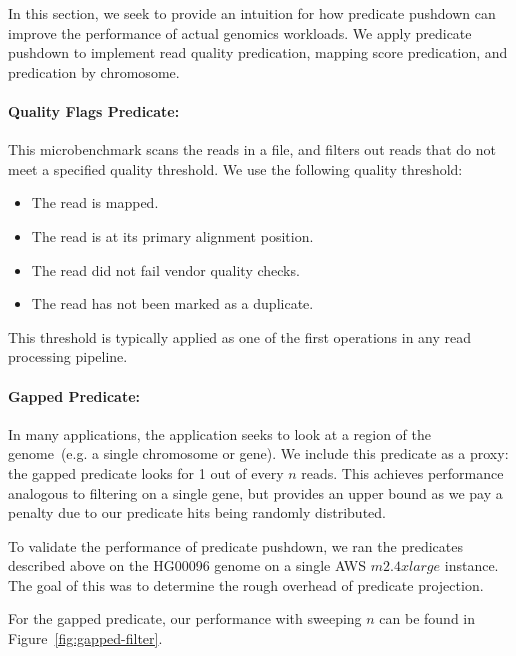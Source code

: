 \documentclass[10pt,twocolumn]{article}
\theoremstyle{plain}
\begin{document}
In this section, we seek to provide an intuition for how predicate pushdown can improve the performance of actual genomics workloads.
We apply predicate pushdown to implement read quality predication, mapping score predication, and predication by chromosome. 

\paragraph{Quality Flags Predicate:}
\label{sec:quality-flags-predicate}

This microbenchmark scans the reads in a file, and filters out reads that do not meet a specified quality threshold. We use the following
quality threshold:

\begin{itemize}
\item The read is mapped.
\item The read is at its primary alignment position.
\item The read did not fail vendor quality checks.
\item The read has not been marked as a duplicate.
\end{itemize}

This threshold is typically applied as one of the first operations in any read processing pipeline.

\paragraph{Gapped Predicate:}
\label{sec:gapped-predicate}

In many applications, the application seeks to look at a region of the genome~(e.g. a single chromosome or gene). We include this
predicate as a proxy: the gapped predicate looks for 1 out of every $n$ reads. This achieves performance analogous to filtering
on a single gene, but provides an upper bound as we pay a penalty due to our predicate hits being randomly distributed.

To validate the performance of predicate pushdown, we ran the predicates described above on the HG00096 genome on a
single AWS $m2.4xlarge$ instance. The goal of this was to determine the rough overhead of predicate projection.

For the gapped predicate, our performance with sweeping $n$ can be found in Figure~\ref{fig:gapped-filter}.
\end{document}
